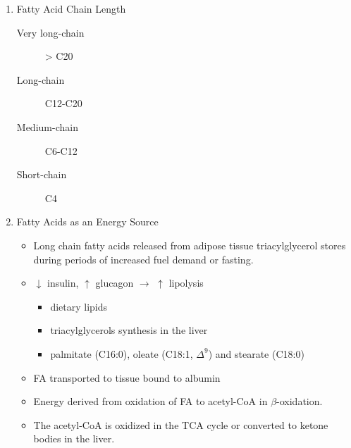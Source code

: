 \documentclass{scrartcl}
\begin{document}
\begin{enumerate}
\item Fatty Acid Chain Length
\label{sec:org1b57be7}

\begin{description}
\item[{Very long-chain}] > C20
\item[{Long-chain}] C12-C20
\item[{Medium-chain}] C6-C12
\item[{Short-chain}] C4
\end{description}

\item Fatty Acids as an Energy Source
\label{sec:org5031dfc}

\begin{itemize}
\item Long chain fatty acids released from adipose tissue triacylglycerol
stores during periods of increased fuel demand or fasting.
\item \(\downarrow\) insulin, \(\uparrow\) glucagon \(\to\) \(\uparrow\) lipolysis
\begin{itemize}
\item dietary lipids
\item triacylglycerols synthesis in the liver
\item palmitate (C16:0), oleate (C18:1, \(\Delta^{\text{9}}\)) and stearate (C18:0)
\end{itemize}
\item FA transported to tissue bound to albumin
\item Energy derived from oxidation of FA to acetyl-CoA in \(\beta\)-oxidation.
\item The acetyl-CoA is oxidized in the TCA cycle or converted to ketone bodies in the liver.
\end{itemize}
\end{enumerate}
\end{document}
